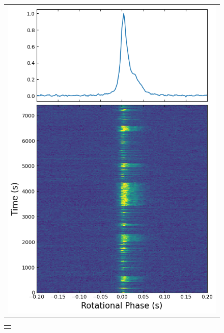 \documentclass[twocolumn]{emulateapj}
\begin{document}
\begin{figure}[b]
\begin{tabular}[b]{@{}p{}@{}}
	\includegraphics[width=\linewidth]{plots/x-band_Jul15.png}
    \end{tabular}
    \begin{tabular}[b]{@{}p{}@{}}
    \centering

\end{tabular}
\end{figure}
\end{document}
